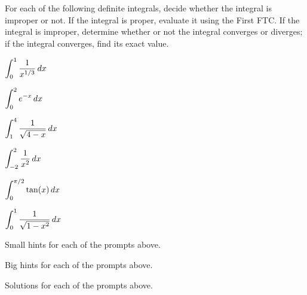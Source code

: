 \begin{activity} \label{A:5.5.3}  For each of the following definite integrals, decide whether the integral is improper or not.  If the integral is proper, evaluate it using the First FTC.  If the integral is improper, determine whether or not the integral converges or diverges; if the integral converges, find its exact value. 
\bmtwo
\ba
	\item $\displaystyle \int_0^1 \frac{1}{x^{1/3}} \, dx$
	\item $\displaystyle \int_0^2 e^{-x} \, dx$
	\item $\displaystyle \int_1^4 \frac{1}{\sqrt{4-x}} \, dx$
	\item $\displaystyle \int_{-2}^2 \frac{1}{x^2} \, dx$
	\item $\displaystyle \int_0^{\pi/2} \tan(x) \, dx$
	\item $\displaystyle \int_0^1 \frac{1}{\sqrt{1-x^2}} \, dx$
\ea
\emtwo

\end{activity}
\begin{smallhint}
\ba
	\item Small hints for each of the prompts above.
\ea
\end{smallhint}
\begin{bighint}
\ba
	\item Big hints for each of the prompts above.
\ea
\end{bighint}
\begin{activitySolution}
\ba
	\item Solutions for each of the prompts above.
\ea
\end{activitySolution}
\aftera